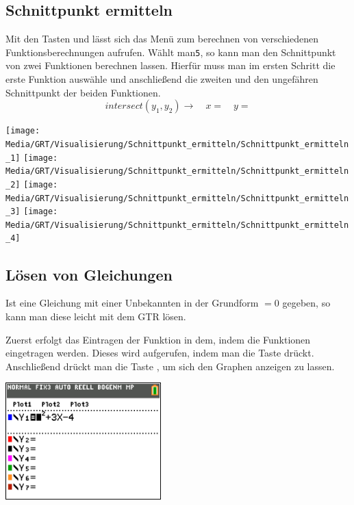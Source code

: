 \subsection{Schnittpunkt ermitteln}

\begin{paracol}{2}
\begin{flushleft}
	Mit den Tasten  und  lässt sich das Menü zum berechnen von verschiedenen Funktionsberechnungen aufrufen. Wählt man\texttt{5}, so kann man den Schnittpunkt von zwei Funktionen berechnen lassen. Hierfür muss man im ersten Schritt die erste Funktion auswähle und anschließend die zweiten und den ungefähren Schnittpunkt der beiden Funktionen.
	\[intersect(y_1,y_2)\rightarrow \quad x=\quad y=\]
	
\end{flushleft}
\switchcolumn
\begin{flushright}
	\texttt{[image: Media/GRT/Visualisierung/Schnittpunkt\_ermitteln/Schnittpunkt\_ermitteln\_1]}
	\texttt{[image: Media/GRT/Visualisierung/Schnittpunkt\_ermitteln/Schnittpunkt\_ermitteln\_2]}
	\texttt{[image: Media/GRT/Visualisierung/Schnittpunkt\_ermitteln/Schnittpunkt\_ermitteln\_3]}
	\texttt{[image: Media/GRT/Visualisierung/Schnittpunkt\_ermitteln/Schnittpunkt\_ermitteln\_4]}
\end{flushright}
\end{paracol}

\subsection{Lösen von Gleichungen}
Ist eine Gleichung mit einer Unbekannten in der Grundform $=0$ gegeben, so kann man diese leicht mit dem GTR lösen.

\begin{paracol}{2}
	\begin{flushleft}
	Zuerst erfolgt das Eintragen der Funktion in dem, indem die Funktionen eingetragen werden. Dieses wird aufgerufen, indem man die Taste  drückt.
		Anschließend drückt man die Taste , um sich den Graphen anzeigen zu lassen. 
	\end{flushleft}
\switchcolumn
	\begin{flushright}
	\includegraphics[width= 6cm]{Media/GRT/Visualisierung/loesen_gleichung/loesen_gleichung_1.png}
		\end{flushright}
\end{paracol}


